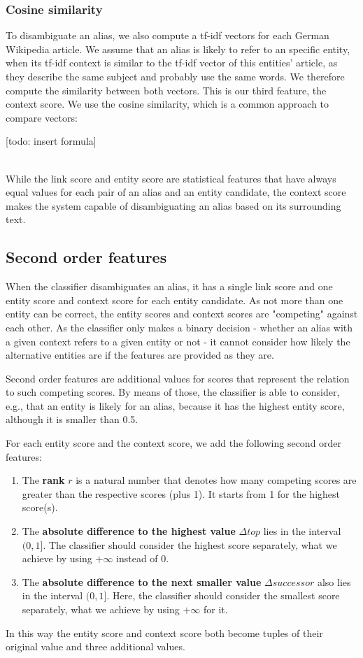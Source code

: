 \subsubsection{Cosine similarity}
To disambiguate an alias, we also compute a tf-idf vectors for each German Wikipedia article. We assume that an alias is likely to refer to an specific entity, when its tf-idf context is similar to the tf-idf vector of this entities' article, as they describe the same subject and probably use the same words. We therefore compute the similarity between both vectors. This is our third feature, the context score. We use the cosine similarity, which is a common approach to compare vectors:

[todo: insert formula]

~\\
While the link score and entity score are statistical features that have always equal values for each pair of an alias and an entity candidate, the context score makes the system capable of disambiguating an alias based on its surrounding text.



\subsection{Second order features}
When the classifier disambiguates an alias, it has a single link score and one entity score and context score for each entity candidate. As not more than one entity can be correct, the entity scores and context scores are "competing" against each other. As the classifier only makes a binary decision - whether an alias with a given context refers to a given entity or not - it cannot consider how likely the alternative entities are if the features are provided as they are.

Second order features are additional values for scores that represent the relation to such competing scores. By means of those, the classifier is able to consider, e.g., that an entity is likely for an alias, because it has the highest entity score, although it is smaller than 0.5.

For each entity score and the context score, we add the following second order features:

\begin{enumerate}
\item The \textbf{rank} $r$ is a natural number that denotes how many competing scores are greater than the respective scores (plus 1). It starts from 1 for the highest score(s).

\item The \textbf{absolute difference to the highest value} $\Delta top$ lies in the interval $(0, 1]$. The classifier should consider the highest score separately, what we achieve by using $+\infty$ instead of 0.

\item The \textbf{absolute difference to the next smaller value} $\Delta successor$ also lies in the interval $(0, 1]$. Here, the classifier should consider the smallest score separately, what we achieve by using $+\infty$ for it.
\end{enumerate}

In this way the entity score and context score both become tuples of their original value and three additional values.